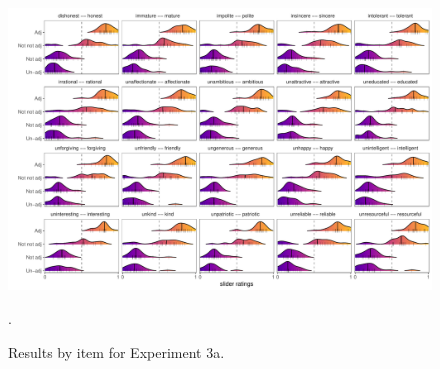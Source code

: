 \documentclass[floatsintext,doc]{apa6}
\begin{document}
\begin{figure}[t]
\centering \includegraphics{figs/expt3_byItem_densities.pdf}
\caption{Results by item for Experiment 3a.}.\label{fig:items_expt3}
\end{figure}



\newpage




\setlength{\bibleftmargin}{.125in}
\setlength{\bibindent}{-\bibleftmargin}


\end{document}

